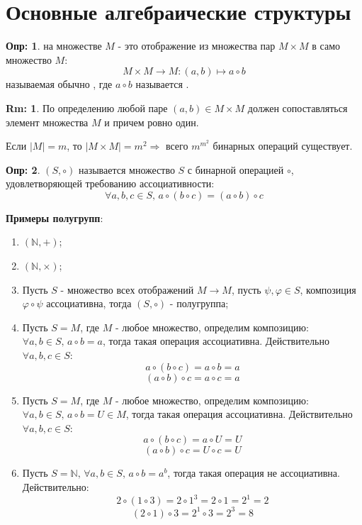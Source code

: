 \documentclass[12pt]{article}
\newcommand{\RN}[1]{%
	\textup{\uppercase\expandafter{\romannumeral#1}}%
}
\newcommand{\MN}{\mathbb{N}}
\theoremstyle{definition}
\newtheorem{defn}{Опр:}
\newtheorem{rem}{Rm:}
\begin{document}
\lhead{Алгебра-\RN{1}}
\section*{Основные алгебраические структуры}
\begin{defn}
	 на множестве $M$ - это отображение из множества пар $M \times M$ в само множество $M$: 
	$$
		M\times M \to M \colon (a,b) \mapsto a\circ b
	$$
	называемая обычно , где $a\circ b$ называется .
\end{defn}
\begin{rem}
	По определению любой паре $(a,b) \in M \times M$ должен сопоставляться элемент множества $M$ и причем ровно один.
\end{rem}
Если $|M| = m$, то $|M\times M| = m^2 \Rightarrow$ всего $m^{m^2}$ бинарных операций существует.

\begin{defn}
	 $(S,\circ)$ называется множество $S$ с бинарной операцией $\circ$, удовлетворяющей требованию ассоциативности:
	$$
		\forall a,b,c \in S,\, a \circ (b\circ c) = (a\circ b)\circ c
	$$
\end{defn}

\textbf{Примеры полугрупп}:
\begin{enumerate}[label=\arabic*)]
	\item $(\MN, +)$;
	\item $(\MN, \times)$;
	\item Пусть $S$ - множество всех отображений $M \to M$, пусть $\psi, \varphi \in S$, композиция $\varphi \circ \psi$ ассоциативна, тогда $(S,\circ)$ - полугруппа;
	\item Пусть $S = M$, где $M$ - любое множество, определим композицию: $\forall a,b \in S,\, a \circ b = a$, тогда такая операция ассоциативна. Действительно $\forall a,b,c \in S$:
	$$
		a \circ (b \circ c) = a \circ b = a
	$$
	$$
		(a \circ b) \circ c = a \circ c = a
	$$
	\item Пусть $S = M$, где $M$ - любое множество, определим композицию: $\forall a,b \in S,\, a \circ b = U \in M$, тогда такая операция ассоциативна. Действительно $\forall a,b,c \in S$:
	$$
		a \circ (b \circ c) = a \circ U = U
	$$
	$$
		(a \circ b) \circ c = U \circ c = U
	$$
	\item Пусть $S = \MN, \, \forall a,b \in S, \, a \circ b = a^b$, тогда такая операция не ассоциативна. Действительно:
	$$
		2 \circ ( 1 \circ 3 ) = 2 \circ 1^3  = 2 \circ 1 = 2^1 = 2
	$$
	$$
		(2 \circ 1)\circ 3 = 2^1 \circ 3 = 2^3 = 8
	$$
\end{enumerate}
\end{document}
